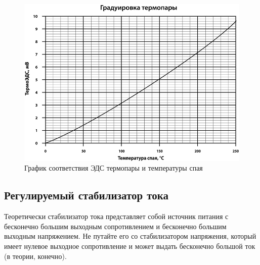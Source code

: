 \begin{figure}[h!]
	\centering
	\includegraphics[width = .9\linewidth]{img/grad.jpg}
	\caption{График соответствия ЭДС термопары и температуры спая}
	\label{fig:6.3}
\end{figure}


\subsection{Регулируемый стабилизатор тока}
Теоретически стабилизатор тока представляет собой источник питания с бесконечно большим выходным сопротивлением и
бесконечно большим выходным напряжением. Не путайте его со стабилизатором напряжения, который имеет нулевое выходное
сопротивление и может выдать бесконечно большой ток (в теории, конечно).

